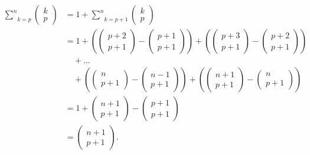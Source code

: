 \begin{enumerate}
\begin{align*}
\underset{k=p}{\overset{n}{\sum}} \begin{pmatrix} k \\ p \end{pmatrix}  &= 1 + \underset{k=p+1}{\overset{n}{\sum}} \begin{pmatrix} k \\ p \end{pmatrix} \\
  & =  1+ \left( \begin{pmatrix} p+2 \\ p+1 \end{pmatrix} - \begin{pmatrix} p+1\\ p+1 \end{pmatrix} \right) + \left( \begin{pmatrix} p+3 \\ p+1 \end{pmatrix} - \begin{pmatrix} p+2\\ p+1 \end{pmatrix} \right)\\ 
 &  \quad + \dots  \\ 
 &\quad + \left( \begin{pmatrix} n \\ p+1 \end{pmatrix} - \begin{pmatrix} n-1 \\ p+1 \end{pmatrix} \right) + \left( \begin{pmatrix} n+1 \\ p+1 \end{pmatrix} - \begin{pmatrix} n\\ p+1 \end{pmatrix}\right) \\
&= 1 + \begin{pmatrix} n+1 \\ p+1 \end{pmatrix} - \begin{pmatrix} p+1\\ p+1 \end{pmatrix} \\
&= \begin{pmatrix} n+1 \\ p+1 \end{pmatrix}.
\end{align*}

     \end{enumerate}